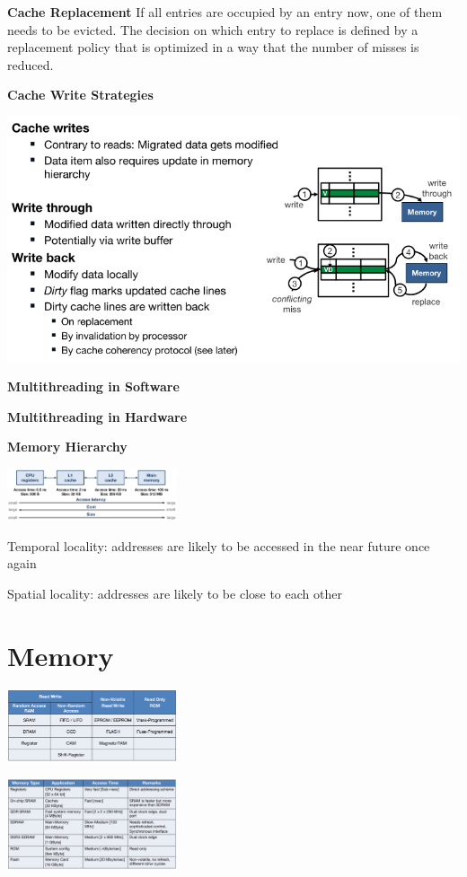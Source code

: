 \documentclass[english]{latex4ei/latex4ei_sheet}
\begin{document}
\textbf{Cache Replacement}
If all entries are occupied by an entry now, one of them needs to be evicted. The decision on which entry to replace is defined by a replacement policy that is optimized in a way that the number of misses is reduced.

\textbf{Cache Write Strategies}

\begin{center}
  \includegraphics[width=\linewidth]{assets/CacheWriteStrategies.png}
  \label{fig:cachewritestrategies}
\end{center}

\textbf{Multithreading in Software}

\textbf{Multithreading in Hardware}



\textbf{Memory Hierarchy}

\begin{center}
	\includegraphics[width = 5cm]{images/4.ProcessorArchitecture/MemoryHierarchy.png}
\end{center}

Temporal locality: addresses are likely to be accessed in the near future once again

Spatial locality: addresses are likely to be close to each other

\section{Memory}
\begin{center}
	\includegraphics[width=5cm]{images/5.Memory/MemoryClassificatoin.png}
\end{center}
\begin{center}
	\includegraphics[width=5cm]{images/5.Memory/MemoryCharacteristics.png}
\end{center}
\end{document}
